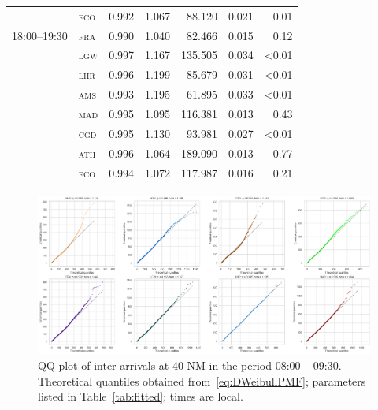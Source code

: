 \documentclass[draft,review]{elsarticle}
\newcommand{\airp}[1]{\textcolor{#1}{\textsc{#1}}}
\begin{document}
\begin{table}
\begin{tabular}{llrrrrr}
                   & \airp{fco} & 0.992 &   1.067 &  88.120 &     0.021 &      0.01 \\
      18:00--19:30 & \airp{fra} & 0.990 &   1.040 &  82.466 &     0.015 &      0.12 \\
                   & \airp{lgw} & 0.997 &   1.167 & 135.505 &     0.034 &     <0.01 \\
                   & \airp{lhr} & 0.996 &   1.199 &  85.679 &     0.031 &     <0.01 \\
                   & \airp{ams} & 0.993 &   1.195 &  61.895 &     0.033 &     <0.01 \\
                   & \airp{mad} & 0.995 &   1.095 & 116.381 &     0.013 &      0.43 \\
                   & \airp{cgd} & 0.995 &   1.130 &  93.981 &     0.027 &     <0.01 \\
                   & \airp{ath} & 0.996 &   1.064 & 189.090 &     0.013 &      0.77 \\
                   & \airp{fco} & 0.994 &   1.072 & 117.987 &     0.016 &      0.21 \\
      \bottomrule
    \end{tabular}
\end{table}

\begin{figure}
    \includegraphics[width=\textwidth]{IA_qqplot0800-0930}
    \caption{QQ-plot of inter-arrivals at 40 NM in the period 08:00 -- 09:30. Theoretical quantiles obtained from~\eqref{eq:DWeibullPMF}; parameters listed in Table~\ref{tab:fitted}; times are local.}
    \label{fig:qqplot5-8}
\end{figure}
\end{document}
